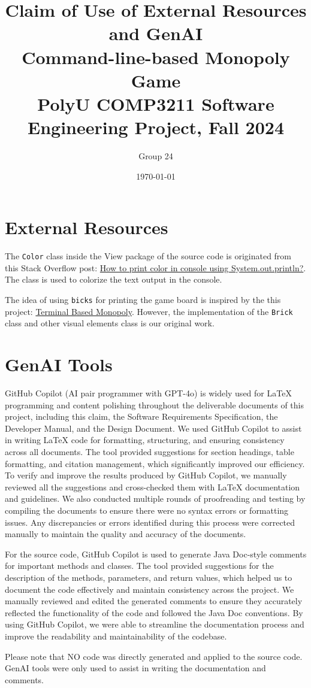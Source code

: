 \documentclass{article}
\title{\textbf{Claim of Use of External Resources and GenAI} \\ {\textbf{Command-line-based Monopoly Game}}\\ {\large PolyU COMP3211 Software Engineering Project, Fall 2024}}
\author{\large Group 24}
\date{\today}
\begin{document}
\maketitle{}

\section{External Resources}

The \texttt{Color} class inside the View package of the source code is originated from
this Stack Overflow post: \href{https://stackoverflow.com/questions/5762491/how-to-print-color-in-console-using-system-out-println}{How to print color in console using System.out.println?}. The class is used to colorize the text output in the console.

The idea of using \texttt{bicks} for printing the game board is inspired by the this project: \href{https://mattsi98.github.io/posts/monopoly.html}{Terminal Based Monopoly}.
However, the implementation of the \texttt{Brick} class and other visual elements class is our original work.

\section{GenAI Tools}

GitHub Copilot (AI pair programmer with GPT-4o) is widely used for \LaTeX\; programming and 
content polishing throughout the deliverable documents of this project, including
this claim, the Software Requirements Specification, the Developer Manual, and the Design Document.
We used GitHub Copilot to assist in writing \LaTeX\; code for formatting, structuring, and ensuring consistency across all documents. The tool provided suggestions for section headings, table formatting, and citation management, which significantly improved our efficiency.
To verify and improve the results produced by GitHub Copilot, we manually reviewed all the suggestions and cross-checked them with \LaTeX\; documentation and guidelines. We also conducted multiple rounds of proofreading and testing by compiling the documents to ensure there were no syntax errors or formatting issues. Any discrepancies or errors identified during this process were corrected manually to maintain the quality and accuracy of the documents.

For the source code, GitHub Copilot is used to generate Java Doc-style comments for important methods and classes. 
The tool provided suggestions for the description of the methods, parameters, and return values, which helped us to document the code effectively and maintain consistency across the project. 
We manually reviewed and edited the generated comments to ensure they accurately reflected the functionality of the code and followed the Java Doc conventions. 
By using GitHub Copilot, we were able to streamline the documentation process and improve the readability and maintainability of the codebase.

Please note that NO code was directly generated and applied to the source code.
GenAI tools were only used to assist in writing the documentation and comments.
\end{document}
